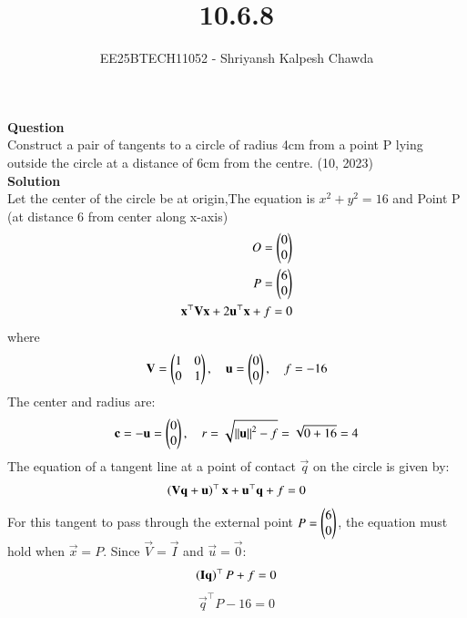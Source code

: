 \documentclass[article]{IEEEtran}
\begin{document}
	\title{10.6.8}
	\author{EE25BTECH11052 - Shriyansh Kalpesh Chawda}
	\maketitle
	\textbf{Question}\\
	Construct a pair of tangents to a circle of radius 4cm from a point P lying outside the circle at 
	a distance of 6cm from the centre.
	\hfill{(10, 2023)}\\
	\textbf{Solution}\\
	Let the center of the circle be at origin,The equation is $x^2 + y^2 = 16$ and Point P (at distance 6 from center along x-axis) 
	\begin{align}
		O = \begin{pmatrix}0\\0\end{pmatrix}\\
		P = \begin{pmatrix}6\\0\end{pmatrix} \\
		\mathbf{x}^\top \mathbf{V} \mathbf{x} + 2\mathbf{u}^\top \mathbf{x} + f = 0
	\end{align}
	where
	\begin{equation}
		\mathbf{V} = \begin{pmatrix}1 & 0\\0 & 1\end{pmatrix}, \quad \mathbf{u} = \begin{pmatrix}0\\0\end{pmatrix}, \quad f = -16
	\end{equation}
	The center and radius are:
	\begin{equation}
		\mathbf{c} = -\mathbf{u} = \begin{pmatrix}0\\0\end{pmatrix}, \quad
		r = \sqrt{\left\lVert\mathbf{u}\right\rVert^2 - f} = \sqrt{0 + 16} = 4
	\end{equation}
The equation of a tangent line at a point of contact $\vec{q}$ on the circle is given by:
	\begin{equation}
		\left(\mathbf{V}\mathbf{q} + \mathbf{u}\right)^\top \mathbf{x} + \mathbf{u}^\top \mathbf{q} + f = 0
	\end{equation}
	For this tangent to pass through the external point $P = \begin{pmatrix}6\\0\end{pmatrix}$, the equation must hold when $\vec{x}=P$. Since $\vec{V}=\vec{I}$ and $\vec{u}=\vec{0}$:
	\begin{equation}
		\left(\mathbf{I}\mathbf{q}\right)^\top P + f = 0
	\end{equation}
	\begin{equation}
		\vec{q}^\top P - 16 = 0
	\end{equation}
	
\end{document}
